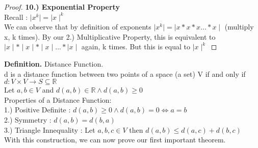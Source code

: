 \documentclass[12pt]{article}
\theoremstyle{definition}
\newenvironment{definition}{\vspace{1em}\noindent\textbf{Definition.}}{\vspace{1em}}
\begin{document}
\begin{proof}
  \textbf{10.) Exponential Property}\\
  Recall : $\mid x^k \mid = \mid x \mid^k$\\
  We can observe that by definition of exponents $\mid x^k \mid = \mid x * x * x ... * x \mid$ (multiply x, k times). By our 2.) Multiplicative Property, this is equivalent to
  $\mid x \mid * \mid x \mid * \mid x \mid ... * \mid x \mid $ again, k times. But this is equal to $\mid x \mid ^k$
\end{proof}
\newpage
\begin{definition}
 Distance Function.\\
 d is a distance function between two points of a space (a set) V if and only if\\
 $d: V \times V \longrightarrow S \subseteq \mathbb{R}$\\
 Let $a,b \in V$ and $d(a,b) \in \mathbb{R} \land d(a,b) \ge 0$\\
 Properties of a Distance Function:\\
 1.) Positive Definite : $d(a,b) \ge 0 \land d(a,b) = 0 \iff a = b$\\
 2.) Symmetry : $d(a,b) = d(b,a)$\\
 3.) Triangle Innequality : Let $a,b,c \in V$ then $ d(a,b) \le d(a,c) + d(b,c) $\\
 With this construction, we can now prove our first important theorem.\\

\end{definition}
\end{document}
